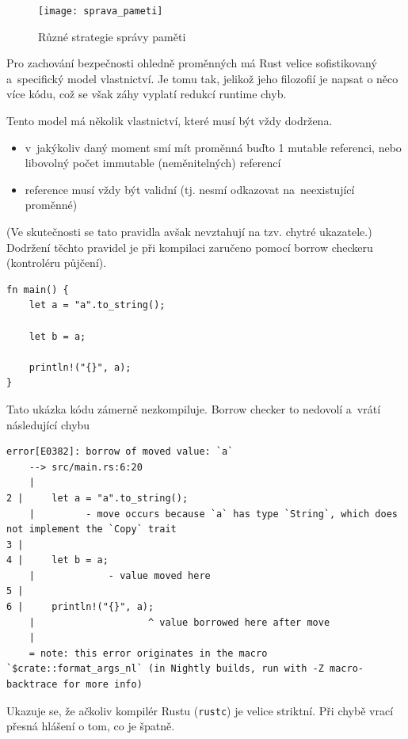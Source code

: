 \documentclass[a4paper, 12pt, twoside]{article} %
\begin{document}
			\begin{center}
				\begin{figure}[H]
					\centering
					\texttt{[image: sprava\_pameti]}
					\caption{Různé strategie správy paměti \cite{sprava_pameti}}
					\label{fig:ret_mod}
				\end{figure}
			\end{center}
		
			Pro zachování bezpečnosti ohledně proměnných má Rust velice sofistikovaný a~specifický model vlastnictví. Je tomu tak, jelikož jeho filozofií je napsat o něco více kódu, což se však záhy vyplatí redukcí runtime chyb.
	
			Tento model má několik vlastnictví, které musí být vždy dodržena.
			\begin{itemize}
				\item v~jakýkoliv daný moment smí mít proměnná buďto 1 mutable referenci, nebo libovolný počet immutable (neměnitelných) referencí
				\item reference musí vždy být validní (tj. nesmí odkazovat na~neexistující proměnné)
			\end{itemize}
			
			(Ve skutečnosti se tato pravidla avšak nevztahují na tzv. chytré ukazatele.) Dodržení těchto pravidel je při kompilaci zaručeno pomocí borrow checkeru (kontroléru půjčení).
			\begin{verbatim}
fn main() {
	let a = "a".to_string();
	
	let b = a;
	
	println!("{}", a);
}
			\end{verbatim}
	
			Tato ukázka kódu zámerně nezkompiluje. Borrow checker to nedovolí a~vrátí následující chybu
			\begin{verbatim}
error[E0382]: borrow of moved value: `a`
	--> src/main.rs:6:20
	|
2 |     let a = "a".to_string();
	|         - move occurs because `a` has type `String`, which does not implement the `Copy` trait
3 |     
4 |     let b = a;
	|             - value moved here
5 |     
6 |     println!("{}", a);
	|                    ^ value borrowed here after move
	|
	= note: this error originates in the macro `$crate::format_args_nl` (in Nightly builds, run with -Z macro-backtrace for more info)

				\end{verbatim}
					
				Ukazuje se, že ačkoliv kompilér Rustu (\texttt{rustc}) je velice striktní. Při chybě vrací přesná hlášení o tom, co je špatně.
				
\end{document}
